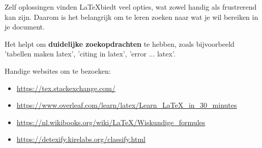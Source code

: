 
\begin{frame}{Zelf oplossingen vinden}
	\LaTeX biedt veel opties, wat zowel handig als frustrerend kan zijn. Daarom is het belangrijk om te leren zoeken naar wat je wil bereiken in je document. 
	
	Het helpt om \textbf{duidelijke zoekopdrachten} te hebben, zoals bijvoorbeeld 'tabellen maken latex', 'citing in latex', 'error ... latex'. 
	
	Handige websites om te bezoeken:
	\begin{itemize}
		\item \url{https://tex.stackexchange.com/}
		\item \url{https://www.overleaf.com/learn/latex/Learn_LaTeX_in_30_minutes}
		\item \url{https://nl.wikibooks.org/wiki/LaTeX/Wiskundige_formules}
		\item \url{https://detexify.kirelabs.org/classify.html}
	\end{itemize}
\end{frame}